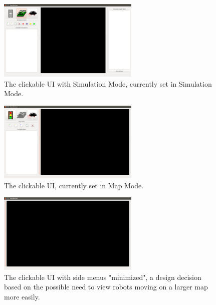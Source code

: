 \begin{figure}[H]
	\begin{center}
		\includegraphics[width=0.60\textwidth]{./Images/Sprint1_clickableUI_SimulationMode}
	\end{center}
	\caption{The clickable UI with Simulation Mode, currently set in Simulation Mode.  \label{clickableuisimulation}}
\end{figure}

\begin{figure}[H]
	\begin{center}
		\includegraphics[width=0.60\textwidth]{./Images/Sprint1_clickableUI_MapMode}
	\end{center}
	\caption{The clickable UI, currently set in Map Mode. \label{clickableuimap}}
\end{figure}

\begin{figure}[H]
	\begin{center}
		\includegraphics[width=0.60\textwidth]{./Images/Sprint1_clickableUI_NoMenus}
	\end{center}
	\caption{The clickable UI with side menus "minimized", a design decision based on the possible need to view robots moving on a larger map more easily. \label{clickableuinomenus}}
\end{figure}

